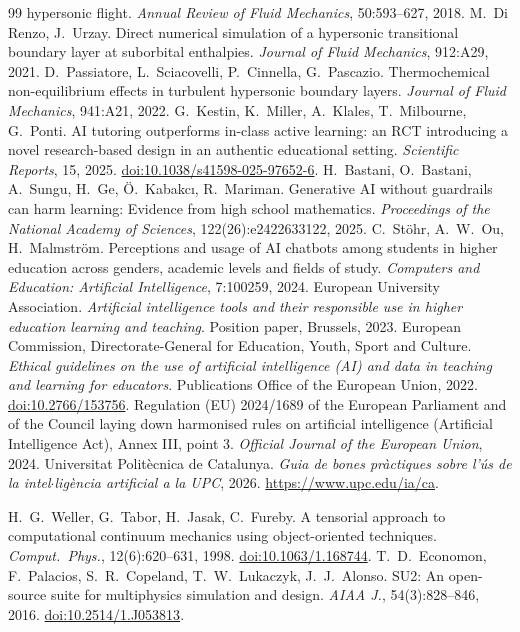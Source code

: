 \documentclass[11pt]{article}
\begin{document}
\begin{thebibliography}{99}
hypersonic flight. \emph{Annual Review of Fluid Mechanics}, 50:593--627, 2018.
 M.\ Di Renzo, J.\ Urzay. Direct numerical simulation of a
hypersonic transitional boundary layer at suborbital enthalpies. \emph{Journal of Fluid
Mechanics}, 912:A29, 2021.
 D.\ Passiatore, L.\ Sciacovelli, P.\ Cinnella, G.\ Pascazio.
Thermochemical non-equilibrium effects in turbulent hypersonic boundary layers.
\emph{Journal of Fluid Mechanics}, 941:A21, 2022.
 G.\ Kestin, K.\ Miller, A.\ Klales, T.\ Milbourne, G.\ Ponti. AI tutoring
outperforms in-class active learning: an RCT introducing a novel research-based design in an
authentic educational setting. \emph{Scientific Reports}, 15, 2025.
\href{https://doi.org/10.1038/s41598-025-97652-6}{doi:10.1038/s41598-025-97652-6}.
 H.\ Bastani, O.\ Bastani, A.\ Sungu, H.\ Ge, \"O.\ Kabakc\i{}, R.\
Mariman. Generative AI without guardrails can harm learning: Evidence from high school
mathematics. \emph{Proceedings of the National Academy of Sciences}, 122(26):e2422633122,
2025.
 C.\ St\"ohr, A.\ W.\ Ou, H.\ Malmstr\"om. Perceptions and usage of AI
chatbots among students in higher education across genders, academic levels and fields of
study. \emph{Computers and Education: Artificial Intelligence}, 7:100259, 2024.
\bibitem{EUA2023} European University Association. \emph{Artificial intelligence tools and
their responsible use in higher education learning and teaching}. Position paper,
Brussels, 2023.
 European Commission, Directorate-General for Education, Youth, Sport and
Culture. \emph{Ethical guidelines on the use of artificial intelligence (AI) and data in
teaching and learning for educators}. Publications Office of the European Union, 2022.
\href{https://data.europa.eu/doi/10.2766/153756}{doi:10.2766/153756}.
\bibitem{AIAct2024} Regulation (EU) 2024/1689 of the European Parliament and of the Council
laying down harmonised rules on artificial intelligence (Artificial Intelligence Act),
Annex III, point 3. \emph{Official Journal of the European Union}, 2024.
\bibitem{UPCAI2026} Universitat Polit\`ecnica de Catalunya. \emph{Guia de bones pr\`actiques
sobre l'\'us de la intel$\cdot$lig\`encia artificial a la UPC}, 2026.
\url{https://www.upc.edu/ia/ca}.

 H.\ G.\ Weller, G.\ Tabor, H.\ Jasak, C.\ Fureby. A tensorial approach to computational continuum mechanics using object-oriented techniques. \emph{Comput.\ Phys.}, 12(6):620--631, 1998. \href{https://doi.org/10.1063/1.168744}{doi:10.1063/1.168744}.
\bibitem{Economon2016} T.\ D.\ Economon, F.\ Palacios, S.\ R.\ Copeland, T.\ W.\ Lukaczyk, J.\ J.\ Alonso. SU2: An open-source suite for multiphysics simulation and design. \emph{AIAA J.}, 54(3):828--846, 2016. \href{https://doi.org/10.2514/1.J053813}{doi:10.2514/1.J053813}.
\end{thebibliography}
\end{document}
